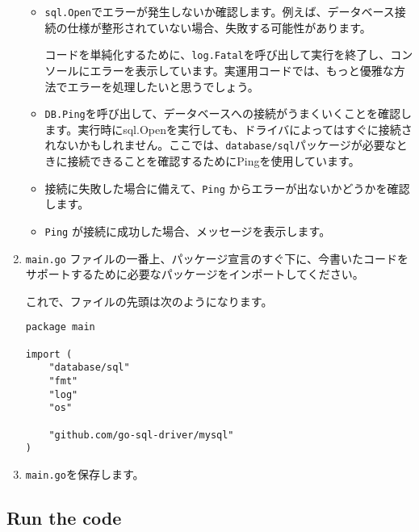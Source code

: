 \begin{enumerate}
\begin{itemize}
\item \texttt{sql.Open}でエラーが発生しないか確認します。例えば、データベース接続の仕様が整形されていない場合、失敗する可能性があります。

コードを単純化するために、\texttt{log.Fatal}を呼び出して実行を終了し、コンソールにエラーを表示しています。実運用コードでは、もっと優雅な方法でエラーを処理したいと思うでしょう。

\item \texttt{DB.Ping}を呼び出して、データベースへの接続がうまくいくことを確認します。実行時にsql.Openを実行しても、ドライバによってはすぐに接続されないかもしれません。ここでは、\texttt{database/sql}パッケージが必要なときに接続できることを確認するためにPingを使用しています。

\item 接続に失敗した場合に備えて、\texttt{Ping} からエラーが出ないかどうかを確認します。

\item \texttt{Ping} が接続に成功した場合、メッセージを表示します。
\end{itemize}

\item \texttt{main.go} ファイルの一番上、パッケージ宣言のすぐ下に、今書いたコードをサポートするために必要なパッケージをインポートしてください。

これで、ファイルの先頭は次のようになります。

\begin{lstlisting}[numbers=none]
package main

import (
    "database/sql"
    "fmt"
    "log"
    "os"

    "github.com/go-sql-driver/mysql"
)
\end{lstlisting}

\item \texttt{main.go}を保存します。

\end{enumerate}

\subsection{Run the code}

